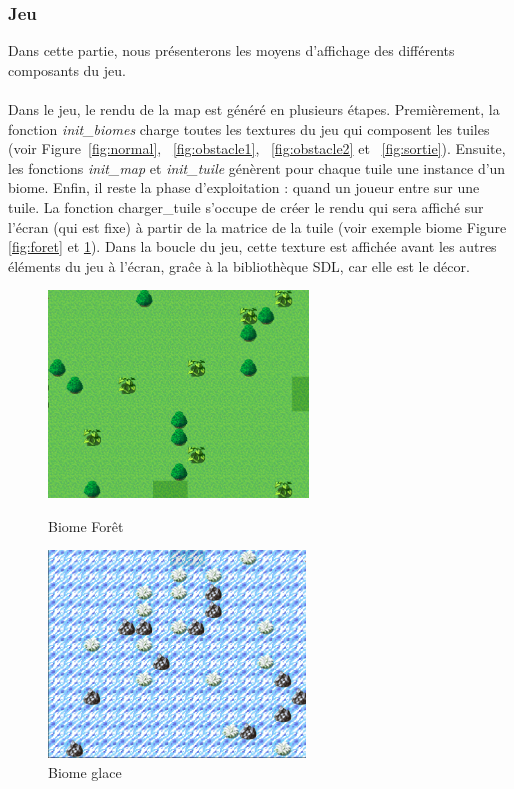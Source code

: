 \documentclass[11pt]{article}
\begin{document}
            \subsubsection{Jeu}
            Dans cette partie, nous présenterons les moyens d’affichage des différents composants du jeu.\\\\
            Dans le jeu, le rendu de la map est généré en plusieurs étapes. Premièrement, la fonction \textit{init\_biomes} charge toutes les textures du jeu
            qui composent les tuiles (voir Figure~\ref{fig:normal}, ~\ref{fig:obstacle1}, ~\ref{fig:obstacle2} et ~\ref{fig:sortie}). Ensuite, les fonctions \textit{init\_map} et \textit{init\_tuile} génèrent pour chaque tuile une instance d’un biome. Enfin, il reste la phase d’exploitation : 
            quand un joueur entre sur une tuile. La fonction charger\_tuile s’occupe de créer le rendu qui sera affiché sur l’écran (qui est fixe) 
            à partir de la matrice de la tuile (voir exemple biome Figure \ref{fig:foret} et \ref{fig:glace}).
            Dans la boucle du jeu, cette texture est affichée avant les autres éléments du jeu à l’écran, graĉe à la bibliothèque SDL, car elle est le décor.\\
            \begin{figure}[H]
                \centering
                \begin{minipage}{0.45\textwidth}
                    \centering
                    \includegraphics[height=5.5cm]{biomeForet.png}
                    \caption{Biome Forêt}
                    \label{fig:foret}
                \end{minipage}
                \hfill
                \begin{minipage}{0.45\textwidth}
                    \centering
                    \includegraphics[height=5.5cm]{biomeGlace.png}
                    \caption{Biome glace}
                    \label{fig:glace}
                \end{minipage}
            \end{figure}
\end{document}
